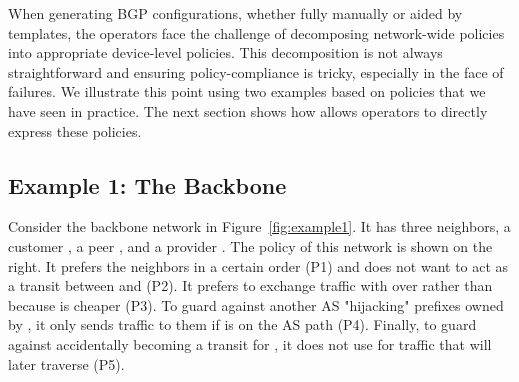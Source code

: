 %

When generating BGP configurations, whether fully manually or aided by templates, the operators face the challenge of decomposing network-wide policies
into appropriate device-level policies.
This decomposition is not always straightforward and ensuring policy-compliance is tricky, especially in the face of failures. We illustrate this point using two examples based on policies that we have seen in practice. The next section shows how \sysname allows operators to directly express these policies. 

\subsection{Example 1:  The Backbone}

Consider the backbone network in Figure~\ref{fig:example1}. It has
three neighbors, a customer , a peer , and a provider . The policy of this network is shown on the right. It prefers the neighbors in a certain order (P1) and does not want to act as a transit between  and  (P2). It prefers to exchange traffic with  over  rather than  because  is cheaper (P3). To guard against another AS "hijacking" prefixes owned by , it only sends traffic to them if  is on the AS path (P4). Finally, to guard against  accidentally becoming a transit for , it does not use  for traffic that will later traverse  (P5).

